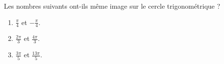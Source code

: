 
\begin{exercice}\label{exosmath-0362}

    Les nombres suivants ont-ils même image sur le cercle trigonométrique ?
    \begin{multicols}{2}
    \begin{enumerate}
        \item
            \( \frac{ \pi }{ 4 }\) et \( -\frac{ \pi }{ 4 }\).
        \item
            \( \frac{ 2\pi }{ 3 }\) et \( \frac{ 4\pi }{ 3 }\).
        \item
            \( \frac{ 3\pi }{ 5 }\) et \( \frac{ 13\pi }{ 5 }\).
    \end{enumerate}
    \end{multicols}

\end{exercice}
